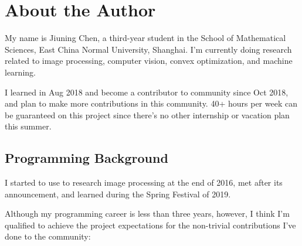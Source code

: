 
\section{About the Author}\label{sec:about_author}

My name is \textsf{Jiuning Chen}, a third-year student in the School of Mathematical Sciences, East China Normal University, Shanghai. I'm currently doing research related to image processing, computer vision, convex optimization, and machine learning.\par

I learned \langjulia in Aug 2018 and become a contributor to \langjulia community since Oct 2018, and plan to make more contributions in this community. 40+ hours per week can be guaranteed on this project since there's no other internship or vacation plan this summer.\par

\subsection*{Programming Background}

I started to use \langmatlab to research image processing at the end of 2016, met  \langjulia after its  announcement, and learned \langpython during the Spring Festival of 2019. \par

Although my programming career is less than three years, however, I think I'm qualified to achieve the project expectations for the non-trivial contributions I've done to the \langjulia{} community:

